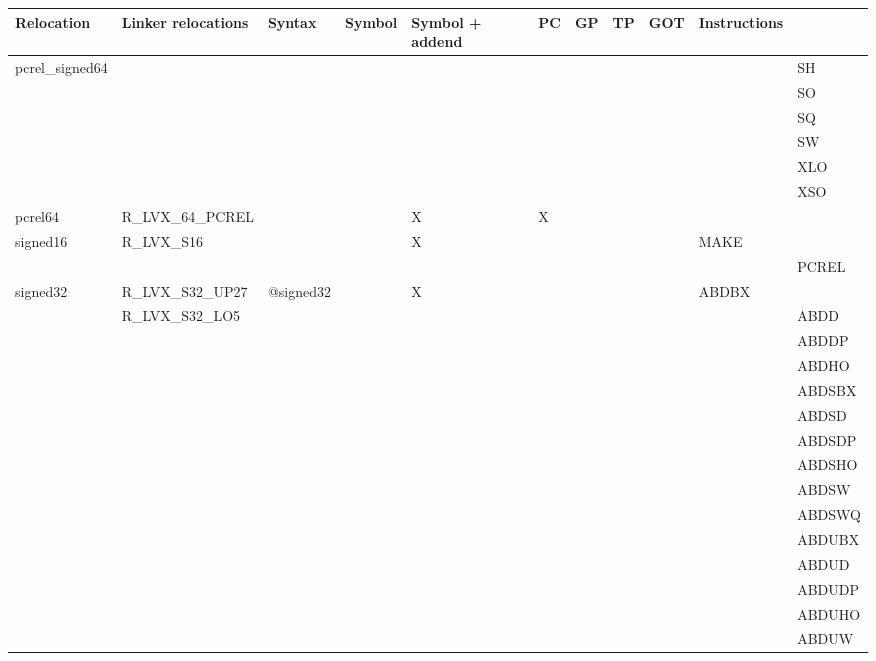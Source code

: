 {\tiny
\begin{tabular}{|l|l|l|l|l|l|l|l|l|l|l|} \hline
\textsf{Relocation} & \textsf{Linker relocations} & \textsf{Syntax} & \textsf{Symbol} & \textsf{Symbol + addend} & \textsf{PC} & \textsf{GP} & \textsf{TP} & \textsf{GOT} & \textsf{Instructions} \\
\hline
\textsf{pcrel\_signed64} & & & & & & & & & & \textsf{SH} \\
 & & & & & & & & & & \textsf{SO} \\
 & & & & & & & & & & \textsf{SQ} \\
 & & & & & & & & & & \textsf{SW} \\
 & & & & & & & & & & \textsf{XLO} \\
 & & & & & & & & & & \textsf{XSO} \\
\hline
\textsf{pcrel64} & \textsf{R\_LVX\_64\_PCREL} & \textsf{} & \textsf{} & \textsf{X} & \textsf{X} & \textsf{} & \textsf{} & \textsf{} & \textsf{} \\
\hline
\textsf{signed16} & \textsf{R\_LVX\_S16} & \textsf{} & \textsf{} & \textsf{X} & \textsf{} & \textsf{} & \textsf{} & \textsf{} & \textsf{MAKE} \\
 & & & & & & & & & & \textsf{PCREL} \\
\hline
\textsf{signed32} & \textsf{R\_LVX\_S32\_UP27} & \textsf{@signed32} & \textsf{} & \textsf{X} & \textsf{} & \textsf{} & \textsf{} & \textsf{} & \textsf{ABDBX} \\
 & \textsf{R\_LVX\_S32\_LO5} & & & & & & & & & \textsf{ABDD} \\
 & & & & & & & & & & \textsf{ABDDP} \\
 & & & & & & & & & & \textsf{ABDHO} \\
 & & & & & & & & & & \textsf{ABDSBX} \\
 & & & & & & & & & & \textsf{ABDSD} \\
 & & & & & & & & & & \textsf{ABDSDP} \\
 & & & & & & & & & & \textsf{ABDSHO} \\
 & & & & & & & & & & \textsf{ABDSW} \\
 & & & & & & & & & & \textsf{ABDSWQ} \\
 & & & & & & & & & & \textsf{ABDUBX} \\
 & & & & & & & & & & \textsf{ABDUD} \\
 & & & & & & & & & & \textsf{ABDUDP} \\
 & & & & & & & & & & \textsf{ABDUHO} \\
 & & & & & & & & & & \textsf{ABDUW} \\

\end{tabular}}
